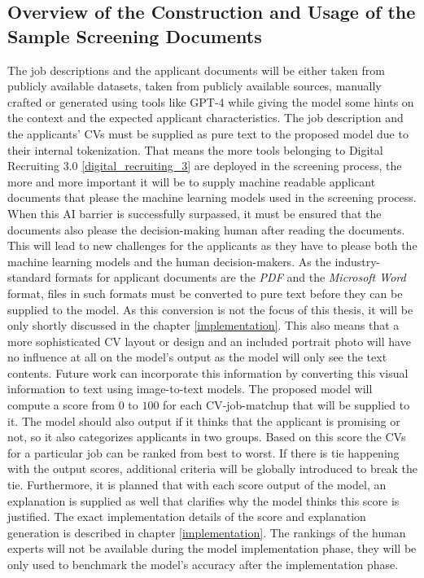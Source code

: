 \documentclass[draft,final]{thesisclass} %
\begin{document}
\subsection{Overview of the Construction and Usage of the Sample Screening Documents}
The job descriptions and the applicant documents will be either taken from publicly available datasets, taken from publicly available sources, manually crafted or generated using tools like GPT-4 \parencite{gpt4} while giving the model some hints on the context and the expected applicant characteristics.
The job description and the applicants' \acs{CV}s must be supplied as pure text to the proposed model due to their internal tokenization.
That means the more tools belonging to Digital Recruiting 3.0 \ref{digital_recruiting_3} are deployed in the screening process, the more and more important it will be to supply machine readable applicant documents that please the machine learning models used in the screening process.
When this \acs{AI} barrier is successfully surpassed, it must be ensured that the documents also please the decision-making human after reading the documents.
This will lead to new challenges for the applicants as they have to please both the machine learning models and the human decision-makers.
As the industry-standard formats for applicant documents are the \textit{PDF} and the \textit{Microsoft Word} format, files in such formats must be converted to pure text before they can be supplied to the model.
As this conversion is not the focus of this thesis, it will be only shortly discussed in the chapter \ref{implementation}.
This also means that a more sophisticated \acs{CV} layout or design and an included portrait photo will have no influence at all on the model's output as the model will only see the text contents.
Future work can incorporate this information by converting this visual information to text using image-to-text models.
The proposed model will compute a score from $0$ to $100$ for each \acs{CV}-job-matchup that will be supplied to it.
The model should also output if it thinks that the applicant is promising or not, so it also categorizes applicants in two groups.
Based on this score the \acs{CV}s for a particular job can be ranked from best to worst.
If there is tie happening with the output scores, additional criteria will be globally introduced to break the tie.
Furthermore, it is planned that with each score output of the model, an explanation is supplied as well that clarifies why the model thinks this score is justified.
The exact implementation details of the score and explanation generation is described in chapter \ref{implementation}.
The rankings of the human experts will not be available during the model implementation phase, they will be only used to benchmark the model's accuracy after the implementation phase.
\end{document}
